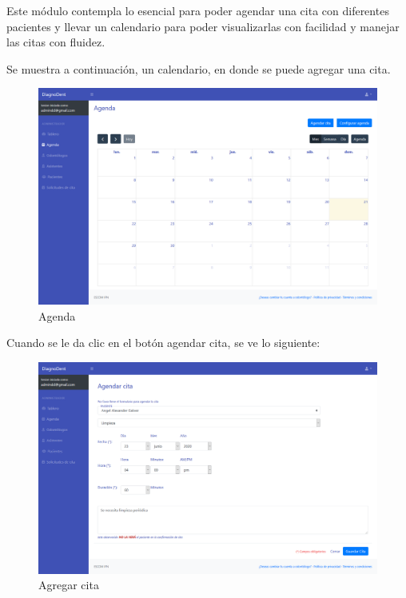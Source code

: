 Este módulo contempla lo esencial para poder agendar una cita con diferentes pacientes y llevar un calendario para poder visualizarlas con facilidad y manejar las citas con fluidez.

\vspace{1em}

Se muestra a continuación, un calendario, en donde se puede agregar una cita.


\begin{figure}[H]
\centering
\includegraphics[width=17cm,keepaspectratio]{pictures/adminodo/citas/agenda-1.png}
\caption{Agenda}
\end{figure}

Cuando se le da clic en el botón agendar cita, se ve lo siguiente:

\begin{figure}[H]
\centering
\includegraphics[width=17cm,keepaspectratio]{pictures/adminodo/citas/agendar-cita.png}
\caption{Agregar cita}
\end{figure}

